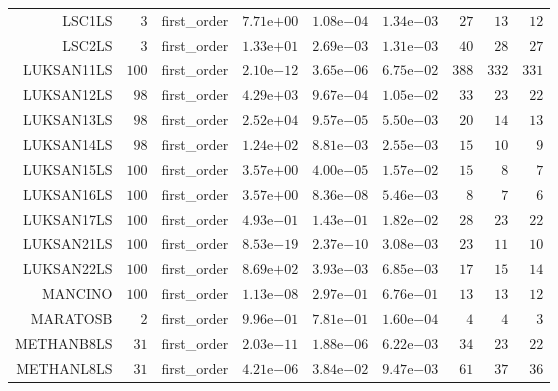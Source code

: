 \begin{longtable}{rrrrrrrrr}
LSC1LS & \(     3\) & first\_order & \( 7.71\)e\(+00\) & \( 1.08\)e\(-04\) & \( 1.34\)e\(-03\) & \(    27\) & \(    13\) & \(    12\) \\
LSC2LS & \(     3\) & first\_order & \( 1.33\)e\(+01\) & \( 2.69\)e\(-03\) & \( 1.31\)e\(-03\) & \(    40\) & \(    28\) & \(    27\) \\
LUKSAN11LS & \(   100\) & first\_order & \( 2.10\)e\(-12\) & \( 3.65\)e\(-06\) & \( 6.75\)e\(-02\) & \(   388\) & \(   332\) & \(   331\) \\
LUKSAN12LS & \(    98\) & first\_order & \( 4.29\)e\(+03\) & \( 9.67\)e\(-04\) & \( 1.05\)e\(-02\) & \(    33\) & \(    23\) & \(    22\) \\
LUKSAN13LS & \(    98\) & first\_order & \( 2.52\)e\(+04\) & \( 9.57\)e\(-05\) & \( 5.50\)e\(-03\) & \(    20\) & \(    14\) & \(    13\) \\
LUKSAN14LS & \(    98\) & first\_order & \( 1.24\)e\(+02\) & \( 8.81\)e\(-03\) & \( 2.55\)e\(-03\) & \(    15\) & \(    10\) & \(     9\) \\
LUKSAN15LS & \(   100\) & first\_order & \( 3.57\)e\(+00\) & \( 4.00\)e\(-05\) & \( 1.57\)e\(-02\) & \(    15\) & \(     8\) & \(     7\) \\
LUKSAN16LS & \(   100\) & first\_order & \( 3.57\)e\(+00\) & \( 8.36\)e\(-08\) & \( 5.46\)e\(-03\) & \(     8\) & \(     7\) & \(     6\) \\
LUKSAN17LS & \(   100\) & first\_order & \( 4.93\)e\(-01\) & \( 1.43\)e\(-01\) & \( 1.82\)e\(-02\) & \(    28\) & \(    23\) & \(    22\) \\
LUKSAN21LS & \(   100\) & first\_order & \( 8.53\)e\(-19\) & \( 2.37\)e\(-10\) & \( 3.08\)e\(-03\) & \(    23\) & \(    11\) & \(    10\) \\
LUKSAN22LS & \(   100\) & first\_order & \( 8.69\)e\(+02\) & \( 3.93\)e\(-03\) & \( 6.85\)e\(-03\) & \(    17\) & \(    15\) & \(    14\) \\
MANCINO & \(   100\) & first\_order & \( 1.13\)e\(-08\) & \( 2.97\)e\(-01\) & \( 6.76\)e\(-01\) & \(    13\) & \(    13\) & \(    12\) \\
MARATOSB & \(     2\) & first\_order & \( 9.96\)e\(-01\) & \( 7.81\)e\(-01\) & \( 1.60\)e\(-04\) & \(     4\) & \(     4\) & \(     3\) \\
METHANB8LS & \(    31\) & first\_order & \( 2.03\)e\(-11\) & \( 1.88\)e\(-06\) & \( 6.22\)e\(-03\) & \(    34\) & \(    23\) & \(    22\) \\
METHANL8LS & \(    31\) & first\_order & \( 4.21\)e\(-06\) & \( 3.84\)e\(-02\) & \( 9.47\)e\(-03\) & \(    61\) & \(    37\) & \(    36\) \\

\end{longtable}
